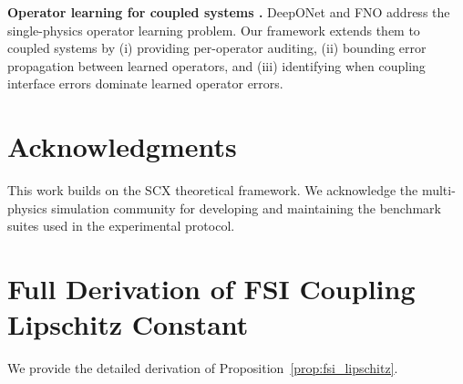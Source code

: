 \documentclass[11pt,a4paper]{article}
\theoremstyle{definition}
\newcommand{\SCX}{\textsc{SCX}}
\begin{document}
\textbf{Operator learning for coupled systems \cite{Lu2021,Li2021}.} DeepONet and FNO address the single-physics operator learning problem. Our framework extends them to coupled systems by (i) providing per-operator auditing, (ii) bounding error propagation between learned operators, and (iii) identifying when coupling interface errors dominate learned operator errors.

\section*{Acknowledgments}

This work builds on the \SCX{} theoretical framework. We acknowledge the multi-physics simulation community for developing and maintaining the benchmark suites used in the experimental protocol.

\appendix
\section{Full Derivation of FSI Coupling Lipschitz Constant}
\label{sec:app_fsi}

We provide the detailed derivation of Proposition~\ref{prop:fsi_lipschitz}.
\end{document}
